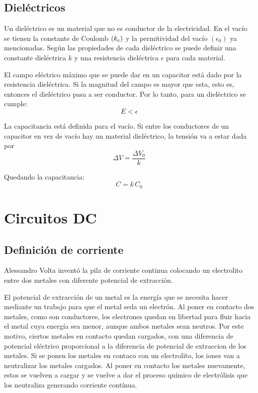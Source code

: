 \documentclass[a5paper,12pt,twoside]{book}
\begin{document}
\section{Dieléctricos}

Un dieléctrico es un material que no es conductor de la electricidad. En el vacío se tienen la constante de Coulomb $(k_e)$ y la permitividad del vacío $(\epsilon_0)$ ya mencionadas. Según las propiedades de cada dieléctrico se puede definir una constante dieléctrica $k$ y una resistencia dieléctrica $\epsilon$ para cada material.

El campo eléctrico máximo que se puede dar en un capacitor está dado por la resistencia dieléctrica. Si la magnitud del campo es mayor que esta, esto es, entonces el dieléctrico pasa a ser conductor. Por lo tanto, para un dieléctrico se cumple:
\begin{equation*}
    E < \epsilon
\end{equation*}

La capacitancia está definida para el vacío. Si entre los conductores de un capacitor en vez de vacío hay un material dieléctrico, la tensión va a estar dada por
\begin{equation*}
    \Delta V = \frac{\Delta V_0}{k}
\end{equation*}

Quedando la capacitancia:
\begin{equation*}
    C = k \, C_0
\end{equation*}


\chapter{Circuitos DC}


\section{Definición de corriente}

Alessandro Volta inventó la pila de corriente continua colocando un electrolito entre dos metales con diferente potencial de extracción.

El potencial de extracción de un metal es la energía que se necesita hacer mediante un trabajo para que el metal seda un electrón. Al poner en contacto dos metales, como son conductores, los electrones quedan en libertad para fluir hacia el metal cuya energía sea menor, aunque ambos metales sean neutros. Por este motivo, ciertos metales en contacto quedan cargados, con una diferencia de potencial eléctrico proporcional a la diferencia de potencial de extraccion de los metales. Si se ponen los metales en contaco con un electrolito, los iones van a neutralizar los metales cargados. Al poner en contacto los metales nuevamente, estos se vuelven a cargar y se vuelve a dar el proceso químico de electrólisis que los neutraliza generando corriente contínua.
\end{document}
